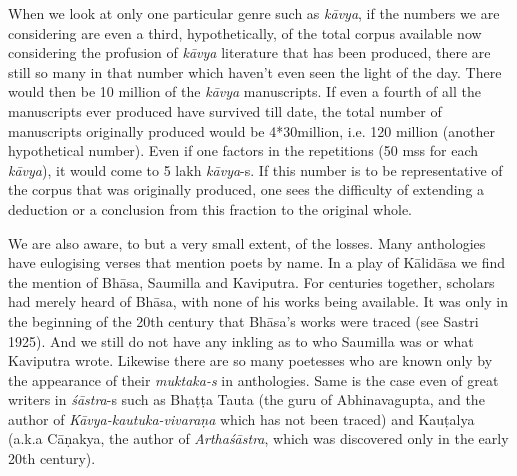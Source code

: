 When we look at only one particular genre such as {\sl kāvya}, if the numbers we are considering are even a third, hypothetically, of the total corpus available now considering the profusion of {\sl kāvya} literature that has been produced, there are still so many in that number which haven’t even seen the light of the day. There would then be 10 million of the {\sl kāvya} manuscripts. If even a fourth of all the manuscripts ever produced have survived till date, the total number of manuscripts originally produced would be 4*30million, i.e. 120 million (another hypothetical number). Even if one factors in the repetitions (50 mss for each {\sl kāvya}), it would come to 5 lakh {\sl kāvya}-s. If this number is to be representative of the corpus that was originally produced, one sees the difficulty of extending a deduction or a conclusion from this fraction to the original whole.

We are also aware, to but a very small extent, of the losses. Many anthologies have eulogising verses that mention poets by name. In a play of Kālidāsa we find the mention of Bhāsa, Saumilla and Kaviputra. For centuries together, scholars had merely heard of Bhāsa, with none of his works being available. It was only in the beginning of the 20th century that Bhāsa’s works were traced (see Sastri 1925). And we still do not have any inkling as to who Saumilla was or what Kaviputra wrote. Likewise there are so many poetesses who are known only by the appearance of their \hbox{{\sl muktaka-s}} in anthologies. Same is the case even of great writers in {\sl śāstra}-s such as Bhaṭṭa Tauta (the guru of Abhinavagupta, and the author of {\sl Kāvya-kautuka-vivaraṇa} which has not been traced) and Kauṭalya (a.k.a Cāṇakya, the author of {\sl Arthaśāstra}, which was discovered only in the early 20th century). 

